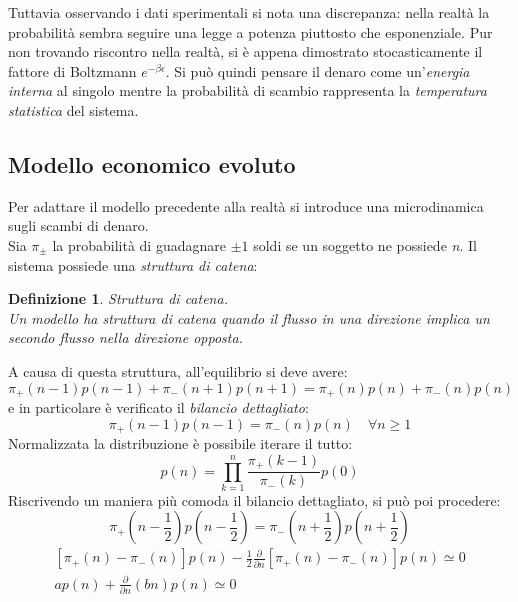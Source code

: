 \documentclass[12pt, a4paper]{book}
\theoremstyle{theorem}
\newtheorem{definition}{Definizione}[section]
\begin{document}
				Tuttavia osservando i dati sperimentali si nota una discrepanza: nella realtà la probabilità sembra seguire una legge a potenza piuttosto che esponenziale.
				Pur non trovando riscontro nella realtà, si è appena dimostrato stocasticamente il fattore di Boltzmann $e^{-\beta\epsilon}$.
				Si può quindi pensare il denaro come un'\emph{energia interna} al singolo mentre la probabilità di scambio rappresenta la \emph{temperatura statistica} del sistema.
			\subsection{Modello economico evoluto}
				Per adattare il modello precedente alla realtà si introduce una microdinamica sugli scambi di denaro.\\
				Sia $\pi_\pm$ la probabilità di guadagnare $\pm 1$ soldi se un soggetto ne possiede \textit{n}. Il sistema possiede una \textit{struttura di catena}:
				\begin{definition}
					Struttura di catena.\\
					Un modello ha struttura di catena quando il flusso in una direzione implica un secondo flusso nella direzione opposta.
				\end{definition}
				A causa di questa struttura, all'equilibrio si deve avere:
				\begin{equation*}
					\pi_+(n-1)p(n-1)+\pi_-(n+1)p(n+1)=\pi_+(n)p(n)+\pi_-(n)p(n)
				\end{equation*}
				e in particolare è verificato il \textit{bilancio dettagliato}:
				\begin{equation}
					\pi_+(n-1)p(n-1)=\pi_-(n)p(n)\quad \forall n\geq 1
				\end{equation}
				Normalizzata la distribuzione è possibile iterare il tutto:
				\begin{equation*}
					p(n)=\prod_{k=1}^n\frac{\pi_+(k-1)}{\pi_-(k)}p(0)
				\end{equation*}
				Riscrivendo un maniera più comoda il bilancio dettagliato, si può poi procedere:
				\begin{equation*}
					\pi_+(n-\frac{1}{2})p(n-\frac{1}{2})=\pi_-(n+\frac{1}{2})p(n+\frac{1}{2})
				\end{equation*}
				\begin{equation*}
					\begin{split}
						[\pi_+(n)-\pi_-(n)]p(n)-\frac{1}{2}\frac{\partial}{\partial n}[\pi_+(n)-\pi_-(n)]p(n)\simeq 0\\
						ap(n)+\frac{\partial}{\partial n}(bn)p(n)\simeq 0
					\end{split}
				\end{equation*}
\end{document}
